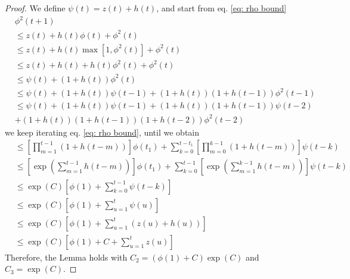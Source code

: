 \documentclass[twoside,11pt,english]{article}
\begin{document}
\PhiSum*
\begin{proof}
We define $\psi\left(t\right)=z\left(t\right)+h\left(t\right)$, and
start from eq. \ref{eq: rho bound}
\begin{align*}
 & \phi^{2}\left(t+1\right)\\
 & \leq z\left(t\right)+h\left(t\right)\phi\left(t\right)+\phi^{2}\left(t\right)\\
 & \leq z\left(t\right)+h\left(t\right)\max\left[1,\phi^{2}\left(t\right)\right]+\phi^{2}\left(t\right)\\
 & \leq z\left(t\right)+h\left(t\right)+h\left(t\right)\phi^{2}\left(t\right)+\phi^{2}\left(t\right)\\
 & \leq\psi\left(t\right)+\left(1+h\left(t\right)\right)\phi^{2}\left(t\right)\\
 & \leq\psi\left(t\right)+\left(1+h\left(t\right)\right)\psi\left(t-1\right)+\left(1+h\left(t\right)\right)\left(1+h\left(t-1\right)\right)\phi^{2}\left(t-1\right)\\
 & \leq\psi\left(t\right)+\left(1+h\left(t\right)\right)\psi\left(t-1\right)+\left(1+h\left(t\right)\right)\left(1+h\left(t-1\right)\right)\psi\left(t-2\right)\\
 & +\left(1+h\left(t\right)\right)\left(1+h\left(t-1\right)\right)\left(1+h\left(t-2\right)\right)\phi^{2}\left(t-2\right)
\end{align*}
we keep iterating eq. \ref{eq: rho bound}, until we obtain
\begin{align*}
 & \leq\left[\prod_{m=1}^{t-1}\left(1+h\left(t-m\right)\right)\right]\phi\left(t_{1}\right)+\sum_{k=0}^{t-t_{1}}\left[\prod_{m=0}^{k-1}\left(1+h\left(t-m\right)\right)\right]\psi\left(t-k\right)\\
 & \leq\left[\exp\left(\sum_{m=1}^{t-1}h\left(t-m\right)\right)\right]\phi\left(t_{1}\right)+\sum_{k=0}^{t-1}\left[\exp\left(\sum_{m=1}^{k-1}h\left(t-m\right)\right)\right]\psi\left(t-k\right)\\
 & \leq\exp\left(C\right)\left[\phi\left(1\right)+\sum_{k=0}^{t-1}\psi\left(t-k\right)\right]\\
 & \leq\exp\left(C\right)\left[\phi\left(1\right)+\sum_{u=1}^{t}\psi\left(u\right)\right]\\
 & \leq\exp\left(C\right)\left[\phi\left(1\right)+\sum_{u=1}^{t}\left(z\left(u\right)+h\left(u\right)\right)\right]\\
 & \leq\exp\left(C\right)\left[\phi\left(1\right)+C+\sum_{u=1}^{t}z\left(u\right)\right]
\end{align*}
Therefore, the Lemma holds with $C_{2}=\left(\phi\left(1\right)+C\right)\exp\left(C\right)$
and $C_{3}=\exp\left(C\right)$.
\end{proof}
\end{document}
